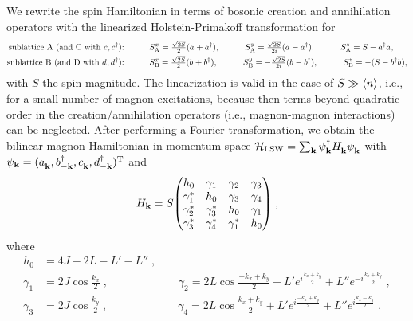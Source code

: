 \documentclass[aps,preprintnumbers,amsmath,amssymb]{revtex4-2}
\begin{document}
We rewrite the spin Hamiltonian in terms of bosonic creation and annihilation operators with the linearized Holstein-Primakoff transformation \cite{HolsteinPrimakoff1940} for
\begin{align*}
    \text{sublattice A (and C with $c^{\vphantom{\dagger}}, c^\dagger$):}&\quad\qquad S^x_\mathrm{A} = \tfrac{\sqrt{2S}}{2}(a^{\vphantom{\dagger}} + a^\dagger), \quad\qquad S^y_\mathrm{A} = \tfrac{\sqrt{2S}}{2i}(a^{\vphantom{\dagger}} - a^\dagger), \quad\qquad S^z_\mathrm{A} = S - a^\dagger a^{\vphantom{\dagger}}, \\
    \text{sublattice B (and D with $d^{\vphantom{\dagger}}, d^\dagger$):}&\quad\qquad S^x_\mathrm{B} = \tfrac{\sqrt{2S}}{2}(b^{\vphantom{\dagger}} + b^\dagger), \quad\qquad S^y_\mathrm{B} = -\tfrac{\sqrt{2S}}{2i}(b^{\vphantom{\dagger}} - b^\dagger), \quad\qquad S^z_\mathrm{B} = -(S - b^\dagger b^{\vphantom{\dagger}}),
\end{align*}
 with $S$ the spin magnitude. The linearization is valid in the case of $S \gg \braket{n}$, i.e., for a small number of magnon excitations, because then terms beyond quadratic order in the creation/annihilation operators (i.e., magnon-magnon interactions) can be neglected. After performing a Fourier transformation, we obtain the bilinear magnon Hamiltonian in momentum space $\mathcal{H}_\mathrm{LSW} = \sum_\mathbf{k} \psi_\mathbf{k}^\dagger H_\mathbf{k}^{\vphantom{\dagger}} \psi_\mathbf{k}^{\vphantom{\dagger}} $ with \mbox{$\psi_\mathbf{k} = (a_\mathbf{k}^{\vphantom{\dagger}},b_{-\mathbf{k}}^\dagger,c_\mathbf{k}^{\vphantom{\dagger}},d_{-\mathbf{k}}^\dagger)^{\text{T}}$} and
\begin{align}
    H_\mathbf{k} =S \mqty(h_0 & \gamma_1 & \gamma_2 & \gamma_3 \\
                         \gamma_1^* & h_0 & \gamma_3 & \gamma_4 \\
                         \gamma_2^* & \gamma_3^* & h_0 & \gamma_1 \\
                         \gamma_3^* & \gamma_4^* & \gamma_1^* & h_0 ) \; ,
\end{align}
where 
\begin{align*}
    h_0 &= 4J-2L-L'-L''\; , \\
    \gamma_1 &= 2J\cos\tfrac{k_x}{2}\; ,  \qquad \qquad \qquad \;
    \gamma_2 = 2L\cos\tfrac{-k_x+k_y}{2} + L'e^{i\tfrac{k_x+k_y}{2}} + L''e^{-i\tfrac{k_x+k_y}{2}} \; , \\
    \gamma_3 &= 2J\cos\tfrac{k_y}{2} \; , \qquad \qquad \qquad \;
    \gamma_4 = 2L\cos\tfrac{k_x+k_y}{2} + L'e^{i\tfrac{-k_x+k_y}{2}} + L''e^{i\tfrac{k_x-k_y}{2}} \; .
\end{align*}
\end{document}

